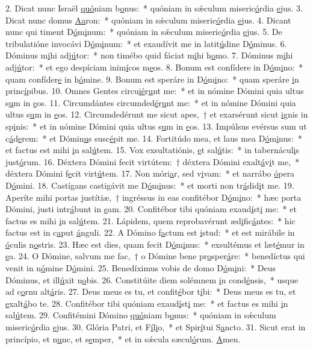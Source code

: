 2. Dicat nunc Israël \uline{quó}niam b\uline{o}nus:~* quóniam in sǽculum miseric\uline{ó}rdia \uline{e}jus.
3. Dicat nunc domus \uline{A}\uline{a}ron:~* quóniam in sǽculum miseric\uline{ó}rdia \uline{e}jus.
4. Dicant nunc qui timent D\uline{ó}m\uline{i}num:~* quóniam in sǽculum miseric\uline{ó}rdia \uline{e}jus.
5. De tribulatióne invocávi D\uline{ó}m\uline{i}num:~* et exaudívit me in latit\uline{ú}dine D\uline{ó}minus.
6. Dóminus m\uline{i}hi adj\uline{ú}tor:~* non timébo quid fáciat m\uline{i}hi h\uline{o}mo.
7. Dóminus m\uline{i}hi adj\uline{ú}tor:~* et ego despíciam inim\uline{í}cos m\uline{e}os.
8. Bonum est confídere in D\uline{ó}m\uline{i}no:~* quam confíder\uline{e} in h\uline{ó}mine.
9. Bonum est speráre in D\uline{ó}m\uline{i}no:~* quam speráre \uline{i}n princ\uline{í}pibus.
10. Omnes Gentes circu\uline{ié}r\uline{u}nt me:~* et in nómine Dómini quia ultus s\uline{u}m in \uline{e}os.
11. Circumdántes circumded\uline{é}r\uline{u}nt me:~* et in nómine Dómini quia ultus s\uline{u}m in \uline{e}os.
12. Circumdedérunt me sicut apes,~† et exarsérunt sicut \uline{i}gnis in sp\uline{i}nis:~* et in nómine Dómini quia ultus s\uline{u}m in \uline{e}os.
13. Impúlsus evérsus sum ut c\uline{á}d\uline{e}rem:~* et Dómin\uline{u}s susc\uline{é}pit me.
14. Fortitúdo mea, et laus mea D\uline{ó}m\uline{i}nus:~* et factus est mihi \uline{i}n sal\uline{ú}tem.
15. Vox exsultatiónis, \uline{e}t sal\uline{ú}tis:~* in tabernácul\uline{i}s just\uline{ó}rum.
16. Déxtera Dómini fecit virtútem:~† déxtera Dómini exalt\uline{á}v\uline{i}t me,~* déxtera Dómini f\uline{e}cit virt\uline{ú}tem.
17. Non móri\uline{a}r, sed v\uline{i}vam:~* et narrábo \uline{ó}pera D\uline{ó}mini.
18. Castígans castigávit me D\uline{ó}m\uline{i}nus:~* et morti non tr\uline{á}did\uline{i}t me.
19. Aperíte mihi portas justítiæ,~† ingréssus in eas confitébor D\uline{ó}m\uline{i}no:~* hæc porta Dómini, justi intr\uline{á}bunt in \uline{e}am.
20. Confitébor tibi quóniam exaud\uline{í}st\uline{i} me:~* et factus es mihi \uline{i}n sal\uline{ú}tem.
21. Lápidem, quem reprobavérunt æd\uline{i}fic\uline{á}ntes:~* hic factus est in c\uline{a}put \uline{á}nguli.
22. A Dómino f\uline{a}ctum est \uline{i}stud:~* et est mirábile in \uline{ó}culis n\uline{o}stris.
23. Hæc est dies, quam fecit D\uline{ó}m\uline{i}nus:~* exsultémus et læt\uline{é}mur in \uline{e}a.
24. O Dómine, salvum me fac,~† o Dómine bene pr\uline{o}sper\uline{á}re:~* benedíctus qui venit in n\uline{ó}mine D\uline{ó}mini.
25. Benedíximus vobis de domo D\uline{ó}m\uline{i}ni:~* Deus Dóminus, et ill\uline{ú}xit n\uline{o}bis.
26. Constitúite diem solémnem \uline{i}n cond\uline{é}nsis,~* usque ad c\uline{o}rnu alt\uline{á}ris.
27. Deus meus es tu, et confit\uline{é}bor t\uline{i}bi:~* Deus meus es tu, et \uline{e}xalt\uline{á}bo te.
28. Confitébor tibi quóniam exaud\uline{í}st\uline{i} me:~* et factus es mihi \uline{i}n sal\uline{ú}tem.
29. Confitémini Dómino \uline{quó}niam b\uline{o}nus:~* quóniam in sǽculum miseric\uline{ó}rdia \uline{e}jus.
30. Glória Patri, et F\uline{í}l\uline{i}o,~* et Spir\uline{í}tui S\uline{a}ncto.
31. Sicut erat in princípio, et n\uline{u}nc, et s\uline{e}mper,~* et in sǽcula sæcul\uline{ó}rum. \uline{A}men.
